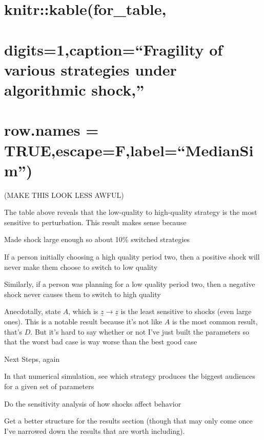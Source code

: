 \documentclass[
]{article}
\begin{document}
\hypertarget{knitrkablefor_table}{%
\section{knitr::kable(for\_table,}\label{knitrkablefor_table}}

\hypertarget{digits1captionfragility-of-various-strategies-under-algorithmic-shock}{%
\section{digits=1,caption=``Fragility of various strategies under
algorithmic
shock,''}\label{digits1captionfragility-of-various-strategies-under-algorithmic-shock}}

\hypertarget{row.names-trueescapeflabelmediansim}{%
\section{row.names =
TRUE,escape=F,label=``MedianSim'')}\label{row.names-trueescapeflabelmediansim}}

(MAKE THIS LOOK LESS AWFUL)

The table above reveals that the low-quality to high-quality strategy is
the most sensitive to perturbation. This result makes sense because

Made shock large enough so about 10\% switched strategies

If a person initially choosing a high quality period two, then a
positive shock will never make them choose to switch to low quality

Similarly, if a person was planning for a low quality period two, then a
negative shock never causes them to switch to high quality

Anecdotally, state \(A\), which is \(\underline{z}\to\underline{z}\) is
the least sensitive to shocks (even large ones). This is a notable
result because it's not like \(A\) is the most common result, that's
\(D\). But it's hard to say whether or not I've just built the
parameters so that the worst bad case is way worse than the best good
case

Next Steps, again

In that numerical simulation, see which strategy produces the biggest
audiences for a given set of parameters

Do the sensitivity analysis of how shocks affect behavior

Get a better structure for the results section (though that may only
come once I've narrowed down the results that are worth including).
\end{document}
